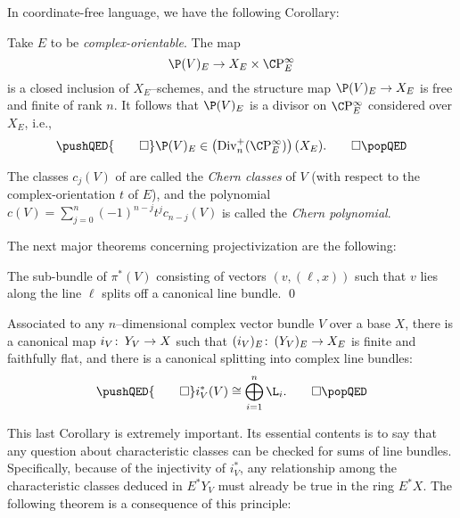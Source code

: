 In coordinate-free language, we have the following Corollary:
\begin{corollary}
Take $E$ to be \emph{complex-orientable}.  The map \[\P(V)_E \to X_E \times \CP^\infty_E\] is a closed inclusion of $X_E$--schemes, and the structure map $\P(V)_E \to X_E$ is free and finite of rank $n$.  It follows that $\P(V)_E$ is a divisor on $\CP^\infty_E$ considered over $X_E$, i.e.,
\[\pushQED{\qed}
\P(V)_E \in \left(\Div_n^+(\CP^\infty_E)\right)(X_E). \qedhere
\popQED\]
\end{corollary}

\begin{definition}
The classes $c_j(V)$ of  are called the \textit{Chern classes} of $V$ (with respect to the complex-orientation $t$ of $E$), and the polynomial $c(V) = \sum_{j=0}^n (-1)^{n-j} t^j c_{n-j}(V)$ is called the \textit{Chern polynomial}.
\end{definition}

The next major theorems concerning projectivization are the following:

\begin{corollary}
The sub-bundle of $\pi^*(V)$ consisting of vectors $(v, (\ell, x))$ such that $v$ lies along the line $\ell$ splits off a canonical line bundle. \qed
\end{corollary}

\begin{corollary}\label{OriginalSplittingPrinciple}
Associated to any $n$--dimensional complex vector bundle $V$ over a base $X$, there is a canonical map $i_V\colon\thinspace Y_V \to X$ such that $(i_V)_E\colon\thinspace (Y_V)_E \to X_E$ is finite and faithfully flat, and there is a canonical splitting into complex line bundles:
\[\pushQED{\qed}
i_V^*(V) \cong \bigoplus_{i=1}^n \L_i. \qedhere
\popQED\]
\end{corollary}

This last Corollary is extremely important.  Its essential contents is to say that any question about characteristic classes can be checked for sums of line bundles.  Specifically, because of the injectivity of $i_V^*$, any relationship among the characteristic classes deduced in $E^* Y_V$ must already be true in the ring $E^* X$.  The following theorem is a consequence of this principle:

